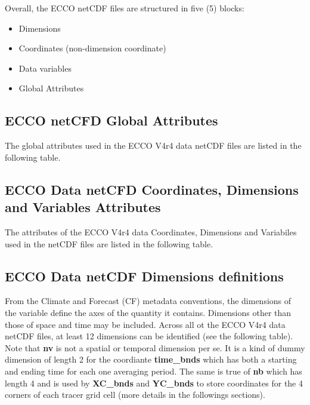 \par \vspace{0.1in} Overall, the ECCO netCDF  files are structured in five (5) blocks: 
\begin{itemize}
    \item Dimensions
    \item Coordinates (non-dimension coordinate)
    \item Data variables
    \item Global Attributes
\end{itemize}

\newpage

\subsection{ECCO netCFD Global Attributes}
\par The global attributes used in the ECCO V4r4 data netCDF files are listed in the following table.
 

\newpage

\subsection{ECCO Data netCFD Coordinates, Dimensions and Variables Attributes}
\par The attributes of the ECCO V4r4 data Coordinates, Dimensions and Variabiles used in the netCDF files are listed in the following table.
 

\newpage

\subsection{ECCO Data netCDF Dimensions definitions}
From the Climate and Forecast (CF) metadata conventions, the dimensions of the variable define the axes of the quantity it contains. Dimensions other than those of space and time may be included. Across all ot the ECCO V4r4 data netCDF files, at least 12 dimensions can be identified (see the following table). Note that \textbf{nv} is not a spatial or temporal dimension per se. It is a kind of dummy dimension of length 2 for the coordiante \textbf{time\_bnds} which has both a starting and ending time for each one averaging period. The same is true of \textbf{nb} which has length 4 and is used by \textbf{XC\_bnds} and \textbf{YC\_bnds} to store coordinates for the 4 corners of each tracer grid cell (more details in the followings sections).


